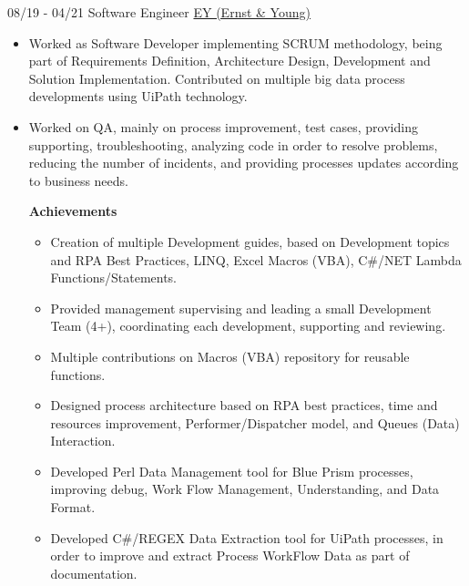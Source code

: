 \documentclass[letterpaper]{twentysecondcv} %
\begin{document}
\begin{twenty}
    \twentyitem
        	{08/19 - 04/21}
            {Software Engineer}
            { \href{https://www.ey.com/es_cr}{EY (Ernst \& Young)} }
            {
                \begin{itemize}
                    \item Worked as Software Developer implementing SCRUM methodology, being part of Requirements Definition, Architecture Design, Development and Solution Implementation. Contributed on multiple big data process developments using UiPath technology.
                    
                    \item Worked on QA, mainly on process improvement, test cases, providing supporting, troubleshooting, analyzing code in order to resolve problems, reducing the number of incidents, and providing processes updates according to business needs.
                
                    \textbf{Achievements}
                    \begin{itemize}
            
                        \item Creation of multiple Development guides, based on Development topics and RPA Best Practices, LINQ, Excel Macros (VBA), C\#/NET Lambda Functions/Statements.
                        
                        \item Provided management supervising and leading a small Development Team (4+), coordinating each development, supporting and reviewing.
                        
                        \item Multiple contributions on Macros (VBA) repository for reusable functions.
                        
                        \item Designed process architecture based on RPA best practices, time and resources improvement, Performer/Dispatcher model, and Queues (Data) Interaction.
                        
                        \item Developed Perl Data Management tool for Blue Prism processes, improving debug, Work Flow Management, Understanding, and Data Format.
            
                        \item Developed C\#/REGEX Data Extraction tool for UiPath processes, in order to improve and extract Process WorkFlow Data as part of documentation.
                        

\end{itemize}
\end{itemize}}
\end{twenty}
\end{document}

